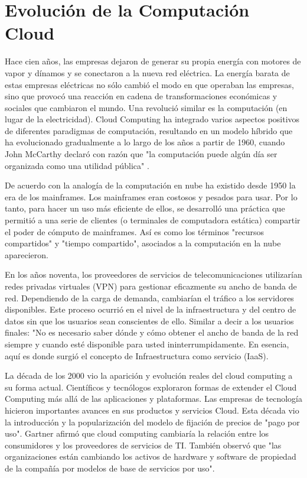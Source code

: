 \documentclass[a4paper, 12pt]{report}
\begin{document}
\section{Evoluci\'on de la Computaci\'on Cloud}
\begin{justify}
Hace cien años, las empresas dejaron de generar su propia energ\'ia con motores de vapor y dínamos y se conectaron a la nueva red el\'ectrica. La energía barata de estas empresas el\'ectricas no s\'olo cambi\'o el modo en que operaban las empresas, sino que provoc\'o una reacción en cadena de transformaciones econ\'omicas y sociales que cambiaron el mundo. Una revoluci\'o similar es la computaci\'on (en lugar de la electricidad). Cloud Computing ha integrado varios aspectos positivos de diferentes paradigmas de computación, resultando en un modelo híbrido que ha evolucionado gradualmente a lo largo de los años a partir de 1960, cuando John McCarthy declar\'o con raz\'on que "la computaci\'on puede alg\'un d\'ia ser organizada como una utilidad p\'ublica" \cite{Abhishek}.

De acuerdo con \cite{Pritam} la analogía de la computación en nube ha existido desde 1950 la era de los mainframes. Los mainframes eran costosos y pesados para usar. Por lo tanto, para hacer un uso más eficiente de ellos, se desarrolló una práctica que permitió a una serie de clientes (o terminales de computadora estática) compartir el poder de cómputo de mainframes. Así es como los términos "recursos compartidos" y "tiempo compartido", asociados a la computación en la nube aparecieron.

En los años noventa, los proveedores de servicios de telecomunicaciones utilizarían redes privadas virtuales (VPN) para gestionar eficazmente su ancho de banda de red. Dependiendo de la carga de demanda, cambiarían el tráfico a los servidores disponibles. Este proceso ocurrió en el nivel de la infraestructura y del centro de datos sin que los usuarios sean conscientes de ello. Similar a decir a los usuarios finales: "No es necesario saber dónde y cómo obtener el ancho de banda de la red siempre y cuando esté disponible para usted ininterrumpidamente. En esencia, aquí es donde surgió el concepto de Infraestructura como servicio (IaaS).

La década de los 2000 vio la aparición y evolución reales del cloud computing a su forma actual. Científicos y tecnólogos exploraron formas de extender el Cloud Computing más allá de las aplicaciones y plataformas. Las empresas de tecnología hicieron importantes avances en sus productos y servicios Cloud. Esta década vio la introducción y la popularización del modelo de fijación de precios de "pago por uso". Gartner afirmó que cloud computing cambiaría la relación entre los consumidores y los proveedores de servicios de TI. También observó que "las organizaciones están cambiando los activos de hardware y software de propiedad de la compañía por modelos de base de servicios por uso".


\end{justify}
\end{document}
